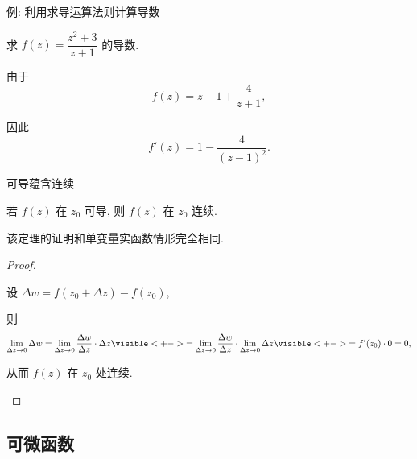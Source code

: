 \begin{frame}{例: 利用求导运算法则计算导数}
	\onslide<+->
	\begin{example}[nearnext]
		求 $f(z)=\dfrac{z^2+3}{z+1}$ 的导数.
	\end{example}
	\onslide<+->
	\begin{solution}[nearprev]
		\begin{itemize*}
			\item 由于
			\[
				f(z)=z-1+\frac4{z+1},
			\]
			\item 因此
			\[
				f'(z)=1-\frac4{(z-1)^2}.
			\]
		\end{itemize*}
	\end{solution}
\end{frame}


\begin{frame}{可导蕴含连续}
	\onslide<+->
	\begin{theorem}[nearprev]
		若 $f(z)$ 在 $z_0$ 可导, 则 $f(z)$ 在 $z_0$ 连续.
	\end{theorem}
	\onslide<+->
	该定理的证明和单变量实函数情形完全相同.
	\onslide<+->
	\begin{proof}
		\begin{itemize*}
			\item 设 $\Delta w=f(z_0+\Delta z)-f(z_0)$,
			\item 则
			\[
				\lim_{\Delta z\to 0}\Delta w
				=\lim_{\Delta z\to 0}\frac{\Delta w}{\Delta z}\cdot\Delta z
				\visible<+->{=\lim_{\Delta z\to 0}\frac{\Delta w}{\Delta z}\cdot\lim_{\Delta z\to 0}\Delta z}
				\visible<+->{=f'(z_0)\cdot 0=0,}
			\]
			\item 从而 $f(z)$ 在 $z_0$ 处连续.\qedhere
		\end{itemize*}
	\end{proof}
\end{frame}


\subsection{可微函数}

